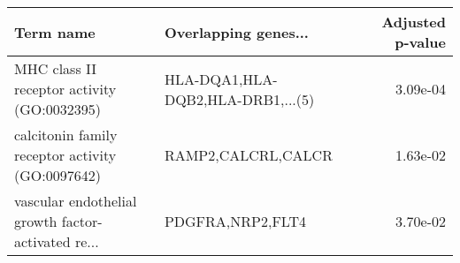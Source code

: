 \begin{tabular}{llr}
\toprule
                                         Term name &              Overlapping genes... &  Adjusted p-value \\
\midrule
       MHC class II receptor activity (GO:0032395) & HLA-DQA1,HLA-DQB2,HLA-DRB1,...(5) &          3.09e-04 \\
  calcitonin family receptor activity (GO:0097642) &                RAMP2,CALCRL,CALCR &          1.63e-02 \\
vascular endothelial growth factor-activated re... &                  PDGFRA,NRP2,FLT4 &          3.70e-02 \\
\bottomrule
\end{tabular}
